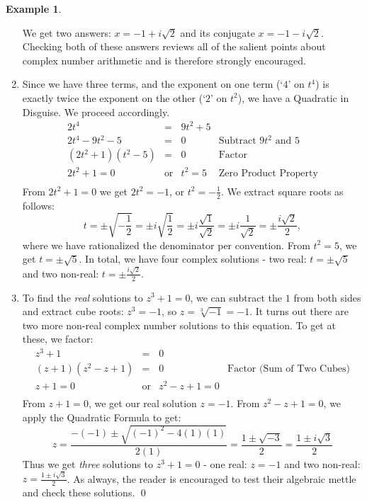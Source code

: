 \documentclass[11pt]{article}
\theoremstyle{definition}  %
\newtheorem{ex}{\bf Example}
\begin{document}
\begin{ex}
\begin{enumerate}
We get two answers: $x = -1 + i\sqrt{2}$ and its conjugate $x = -1 - i\sqrt{2}$.  Checking both of these answers reviews all of the salient points about complex number arithmetic and is therefore strongly encouraged.

\item  Since we have three terms, and the exponent on one term (`$4$' on $t^4$) is exactly twice the exponent on the other (`$2$' on $t^2$), we have a Quadratic in Disguise.  We proceed accordingly.\[ \begin{array}{rclr}

2t^4 & = & 9t^2 + 5 & \\

2t^4 - 9t^2 - 5 & = & 0 & \text{Subtract $9t^2$ and $5$} \\
(2t^2 + 1)(t^2 - 5) & = & 0 & \text{Factor} \\
2t^2 + 1 = 0 & \text{or} & t^2 = 5 & \text{Zero Product Property} \\
\end{array}\]  From $2t^2 + 1 = 0$ we get $2t^2 = -1$, or $t^2 = -\frac{1}{2}$.  We extract square roots as follows: \[ t = \pm \sqrt{-\dfrac{1}{2}} = \pm i \sqrt{\dfrac{1}{2}} = \pm i \dfrac{\sqrt{1}}{\sqrt{2}} = \pm i \dfrac{1}{\sqrt{2}} = \pm \dfrac{i \sqrt{2}}{2},\]
where we have rationalized the denominator per convention.  From $t^2 = 5$, we get $t = \pm \sqrt{5}$. In total, we have four complex solutions - two real: $t = \pm \sqrt{5}$ and two non-real: $t = \pm \frac{i \sqrt{2}}{2}$.

\item To find  the \textit{real} solutions to  $z^3 + 1 = 0$, we can subtract the $1$ from both sides and extract cube roots: $z^3 = -1$, so $z  = \sqrt[3]{-1} = -1$.  It turns out there are two more non-real complex number solutions to this equation.  To get at these, we factor:\[ \begin{array}{rclr}

z ^ 3 + 1 & = & 0 & \\
(z + 1)(z^2 - z + 1) & = & 0 & \text{Factor (Sum of Two Cubes)} \\
z + 1 = 0 & \text{or} & z^2 - z + 1 = 0 & \\
\end{array} \] From $z+1 = 0$, we get our real solution $z = -1$.  From $z^2 -z + 1 = 0$, we apply the Quadratic Formula to get: \[z = \dfrac{-(-1) \pm \sqrt{(-1)^2 - 4(1)(1)}}{2(1)} = \dfrac{1 \pm \sqrt{-3}}{2} = \dfrac{1 \pm i\sqrt{3}}{2} \]
Thus we get \textit{three} solutions to $z^3 + 1 = 0$ - one real: $z = -1$ and two non-real: $z =  \frac{1 \pm i\sqrt{3}}{2}$.  As always, the reader is encouraged to test their algebraic mettle and check these solutions. \qed
		
\end{enumerate}


\end{ex}
\end{document}
